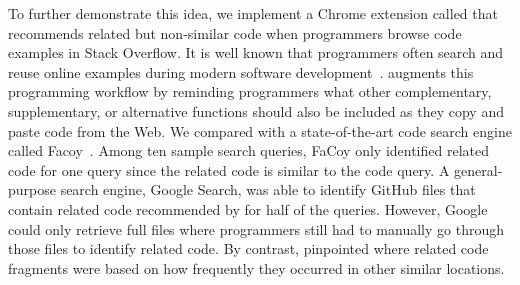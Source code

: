 To further demonstrate this idea, we implement a Chrome extension called {\tool} that recommends related but non-similar code when programmers browse code examples in Stack Overflow. It is well known that programmers often search and reuse online examples during modern software development~\cite{brandt2010example, umarji2008archetypal, gallardo2009internet}. {\tool} augments this programming workflow by reminding programmers what other complementary, supplementary, or alternative functions should also be included as they copy and paste code from the Web. We compared {\tool} with a state-of-the-art code search engine called Facoy~\cite{kim2018Facoy}. Among ten sample search queries, FaCoy only identified related code for one query since the related code is similar to the code query. A general-purpose search engine, Google Search, was able to identify GitHub files that contain related code recommended by {\tool}  for half of the queries. However, Google could only retrieve full files where programmers still had to manually go through those files to identify related code. By contrast, {\tool} pinpointed where related code fragments were based on how frequently they occurred in other similar locations.



